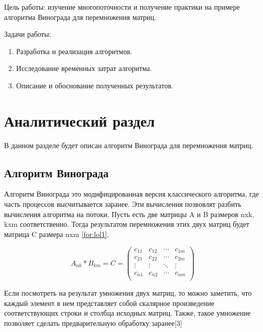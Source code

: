 \documentclass[12pt, a4paper]{report}
\begin{document}
		\vspace{0.3cm}Цель работы: изучение многопоточности и получение практики на примере алгоритма Винограда для перемножения матриц.
	
		\vspace{0.3cm}Задачи работы:
	\begin{enumerate}
		\item Разработка и реализация алгоритмов.
		\item Исследование временных затрат алгоритма.
		\item Описание и обоснование полученных результатов.
	\end{enumerate}
	

    \chapter{Аналитический раздел}
    
   	\vspace{-0.5cm}\hspace{0.6cm}В данном разделе будет описан алгоритм Винограда для перемножения матриц.
   	
   	
	\section{Алгоритм Винограда}
	
	Алгоритм Винограда это модифицированная версия классического алгоритма, где часть процессов высчитывается заранее. Эти вычисления позвовлят разбить вычисления алгоритма на потоки. Пусть есть две матрицы A и B размеров nxk, kxm соответственно. Тогда результатом перемножения этих двух матриц будет матрица C размера nxm \ref{for:lol1}.
	
	\begin{equation}
	A_{nk} * B_{km} = C = \begin{pmatrix}
		c_{11} & c_{12} & \cdots & c_{1m} \\
		c_{21} & c_{22} & \cdots & c_{2m} \\         
		\vdots & \vdots & \ddots & \vdots \\
		c_{n1} & c_{n2} & \cdots & c_{nm} \\
	\end{pmatrix}
	\label{for:lol1}
	\end{equation}
	
	Если посмотреть на результат умножения двух матриц, то можно заметить, что каждый элемент в нем представляет собой скалярное произведение соответствующих строки и столбца исходных матриц. Также, такое умножение позволяет сделать предварительную обработку заранее[3] 
	
\end{document}
